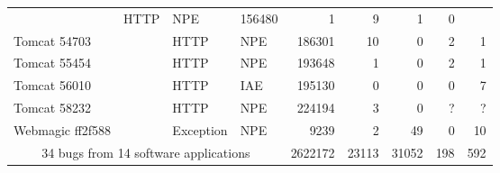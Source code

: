 \begin{table*}
\begin{tabular}{|l|l|l|l|r||r|r|r|r|}
    & HTTP
    & NPE 
    & 156480 
    & 1 
    & 9 
    &  1   
    &  0 \\
    Tomcat 54703 & \cite{gu2016automatic} 
    & HTTP
    & NPE 
    & 186301 
    & 10 
    & 0 
    &  2   
    &  1 \\
    Tomcat 55454 & \cite{gu2016automatic} 
    & HTTP
    & NPE 
    & 193648 
    & 1 
    & 0 
    &  2   
    &  1 \\
    Tomcat 56010 & \cite{gu2016automatic} 
    & HTTP
    & IAE 
    & 195130 
    & 0 
    & 0 
    &  0   
    &  7 \\
    Tomcat 58232 & \cite{gu2016automatic} 
    & HTTP
    & NPE 
    & 224194 
    & 3 
    & 0 
    &  ?   
    &  ? \\
    Webmagic ff2f588 & \cite{long2017automatic} 
    & Exception
    & NPE 
    & 9239 
    & 2 
    & 49 
    &  0   
    &  10 \\
    \hline
    \multicolumn{4}{|c|}{34 bugs from 14 software applications} 
    & 2622172 
    & 23113 
    & 31052 
    & 198 
    & 592 \\
    \hline
  \end{tabular}
\end{table*}